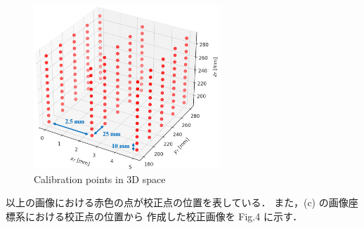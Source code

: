 \documentclass[twocolumn,a4j]{jsarticle}
\begin{document}
\begin{figure}[htbp]
  \centering
  \includegraphics[keepaspectratio, width=70mm]{../images/Calibration/Calibration_points_in_3D_space.png}
  \caption{Calibration points in 3D space}
\end{figure}

\newpage
以上の画像における赤色の点が校正点の位置を表している．
また，(c) の画像座標系における校正点の位置から
作成した校正画像を Fig.4 に示す．
\end{document}

